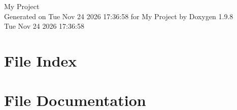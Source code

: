 \documentclass[twoside]{book}
\newcommand{\+}{\discretionary{\mbox{\scriptsize$\hookleftarrow$}}{}{}}
\newcommand{\clearemptydoublepage}{%
    \newpage{\pagestyle{empty}\cleardoublepage}%
  }
\begin{document}
  \raggedbottom
    \hypersetup{pageanchor=false,
                bookmarksnumbered=true,
                pdfencoding=unicode
               }
  \begin{titlepage}
  \vspace*{7cm}
  \begin{center}%
  {\Large My Project}\\
  \vspace*{1cm}
  {\large Generated on Tue Nov 24 2026 17\+:36\+:58 for My Project by Doxygen 1.9.8}\\
    \vspace*{0.5cm}
    {\small Tue Nov 24 2026 17:36:58}
  \end{center}
  \end{titlepage}
  \clearemptydoublepage
  \tableofcontents
  \clearemptydoublepage
  \hypersetup{pageanchor=true}

\chapter{File Index}

\chapter{File Documentation}


  \backmatter
  \newpage
  \clearemptydoublepage
  \printindex
\end{document}
